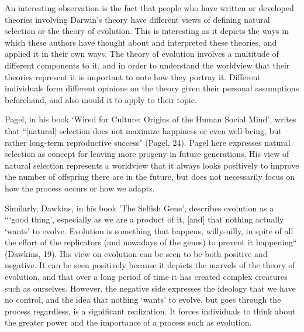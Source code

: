 \documentclass[11pt, oneside]{article}
\begin{document}
\par An interesting observation is the fact that people who have written or developed theories involving Darwin's theory have different views of defining natural selection or the theory of evolution. This is interesting as it depicts the ways in which these authors have thought about and interpreted these theories, and applied it in their own ways. The theory of evolution involves a multitude of different components to it, and in order to understand the worldview that their theories represent it is important to note how they portray it. Different individuals form different opinions on the theory given their personal assumptions beforehand, and also mould it to apply to their topic.

\par Pagel, in his book `Wired for Culture: Origins of the Human Social Mind', writes that ``[natural] selection does not maximize happiness or even well-being, but rather long-term reproductive success" (Pagel, 24). Pagel here expresses natural selection as concept for leaving more progeny in future generations. His view of natural selection represents a worldview that it always looks positively to improve the number of offspring there are in the future, but does not necessarily focus on how the process occurs or how we adapts. 

Similarly, Dawkins, in his book 'The Selfish Gene', describes evolution as a ```good thing', especially as we are a product of it, [and] that nothing actually `wants' to evolve. Evolution is something that happens, willy-nilly, in spite of all the effort of the replicators (and nowadays of the genes) to prevent it happening`` (Dawkins, 19). His view on evolution can be seen to be both positive and negative. It can be seen positively because it depicts the marvels of the theory of evolution, and that over a long period of time it has created  complex creatures such as ourselves. However, the negative side expresses the ideology that we have no control, and the idea that nothing `wants' to evolve, but goes through the process regardless, is a significant realization. It forces individuals to think about the greater power and the importance of a process such as evolution. 


\end{document}
